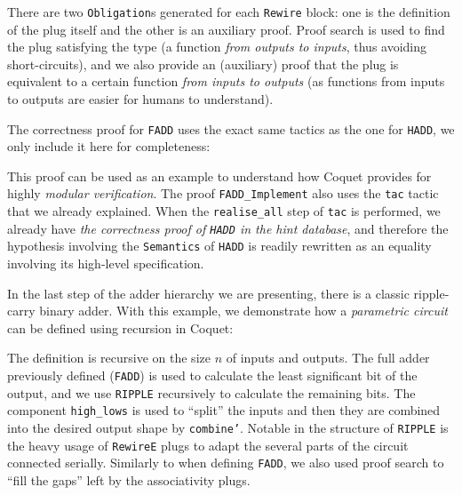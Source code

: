             There are two \texttt{Obligation}s generated for each \texttt{Rewire} block: one is the
            definition of the plug itself and the other is an auxiliary proof. Proof search is used
            to find the plug satisfying the type (a function \emph{from outputs to inputs}, thus
            avoiding short-circuits), and we also provide an (auxiliary) proof that the plug is
            equivalent to a certain function \emph{from inputs to outputs} (as functions from inputs
            to outputs are easier for humans to understand).

            The correctness proof for \texttt{FADD} uses the exact same tactics as the one for
            \texttt{HADD}, we only include it here for completeness:


            This proof can be used as an example to understand how Coquet provides for highly
            \emph{modular verification}. The proof \texttt{FADD\_Implement} also uses the
            \texttt{tac} tactic that we already explained. When the \texttt{realise\_all} step of
            \texttt{tac} is performed, we already have \emph{the correctness proof of \texttt{HADD}
                in the hint database}, and therefore the hypothesis involving the \texttt{Semantics}
            of \texttt{HADD} is readily rewritten as an equality involving its high-level
            specification.

            In the last step of the adder hierarchy we are presenting, there is a classic
            ripple-carry binary adder. With this example, we demonstrate how a \emph{parametric
                circuit} can be defined using recursion in Coquet:


            The definition is recursive on the size $n$ of inputs and outputs. The full adder
            previously defined (\texttt{FADD}) is used to calculate the least significant bit of the
            output, and we use \texttt{RIPPLE} recursively to calculate the remaining bits. The
            component \texttt{high\_lows} is used to ``split'' the inputs and then they are combined
            into the desired output shape by \texttt{combine'}. Notable in the structure of
            \texttt{RIPPLE} is the heavy usage of \texttt{RewireE} plugs to adapt the several parts
            of the circuit connected serially. Similarly to when defining \texttt{FADD}, we also
            used proof search to ``fill the gaps'' left by the associativity plugs.

